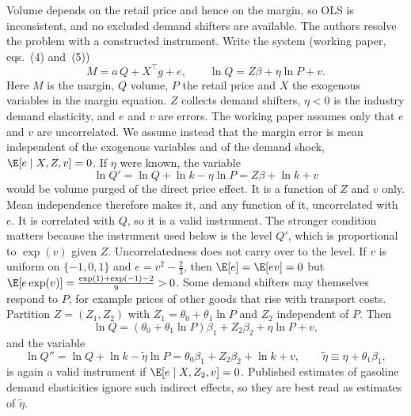 Volume depends on the retail price and hence on the margin, so OLS is inconsistent, and no excluded demand
shifters are available. The authors resolve the problem with a constructed instrument. Write the system
(working paper, eqs.~(4) and~(5))
\begin{equation}\label{eq:13-bs-system}
M=a\,Q+X^{\top}g+e,\qquad \ln Q=Z\beta+\eta\ln P+v.
\end{equation}
Here $M$ is the margin, $Q$ volume, $P$ the retail price and $X$ the exogenous variables in the margin
equation. $Z$ collects demand shifters, $\eta<0$ is the industry demand elasticity, and $e$ and $v$ are errors.
The working paper assumes only that $e$ and $v$ are uncorrelated. We assume instead that the margin error is mean
independent of the exogenous variables and of the demand shock, $\E[e\mid X,Z,v]=0$. If $\eta$ were known, the
variable
\begin{equation}\label{eq:13-bs-qprime}
\ln Q'=\ln Q+\ln k-\eta\ln P=Z\beta+\ln k+v
\end{equation}
would be volume purged of the direct price effect. It is a function of $Z$ and $v$ only. Mean independence
therefore makes it, and any function of it, uncorrelated with $e$. It is correlated with $Q$, so it is a valid
instrument. The stronger condition matters because the instrument used below is the level $Q'$, which is
proportional to $\exp(v)$ given $Z$. Uncorrelatedness does not carry over to the level. If $v$ is uniform on
$\{-1,0,1\}$ and $e=v^2-\frac{2}{3}$, then $\E[e]=\E[ev]=0$ but
$\E[e\exp(v)]=\frac{\exp(1)+\exp(-1)-2}{9}>0$. Some demand shifters may themselves respond to
$P$, for example prices of other goods that rise with transport costs. Partition $Z=(Z_1,Z_2)$ with
$Z_1=\theta_0+\theta_1\ln P$ and $Z_2$ independent of $P$. Then
\begin{equation*}
\ln Q=(\theta_0+\theta_1\ln P)\beta_1+Z_2\beta_2+\eta\ln P+v,
\end{equation*}
and the variable
\begin{equation}\label{eq:13-bs-qdoubleprime}
\ln Q''=\ln Q+\ln k-\tilde\eta\ln P=\theta_0\beta_1+Z_2\beta_2+\ln k+v,\qquad \tilde\eta\equiv\eta+\theta_1\beta_1,
\end{equation}
is again a valid instrument if $\E[e\mid X,Z_2,v]=0$. Published estimates of gasoline demand elasticities ignore such indirect effects,
so they are best read as estimates of $\tilde\eta$.

